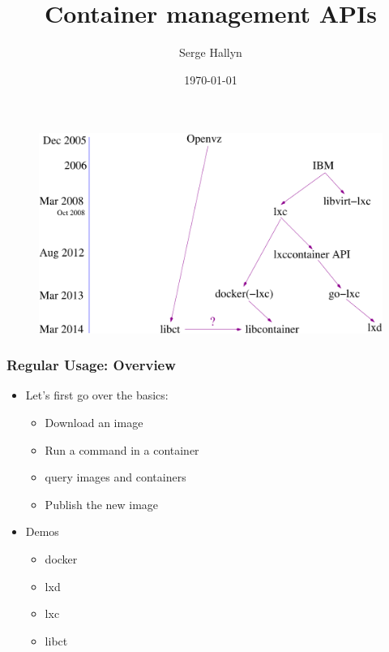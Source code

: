 \documentclass{beamer}
\title[Linux Container APIs]{Container management APIs} %
\author{Serge Hallyn} %
\institute[Canonical] %
{
Canonical, Ltd \\ %
\medskip
\textit{serge.hallyn@ubuntu.com} %
}
\date{\today} %
\begin{document}
\lstset{language=sh}

\begin{frame}
\titlepage %
\end{frame}

\begin{frame}
\begin{figure}
  \includegraphics[width=\textwidth]{timeline.pdf}
\end{figure}
\end{frame}

\begin{frame}
\frametitle{Regular Usage: Overview}
\begin{itemize}
\item Let's first go over the basics:
  \begin{itemize}
  \item Download an image
  \item Run a command in a container
  \item query images and containers
  \item Publish the new image
  \end{itemize}
\item Demos
  \begin{itemize}
  \item docker
  \item lxd
  \item lxc
  \item libct
  \end{itemize}
\end{itemize}
\end{frame}
\end{document}
